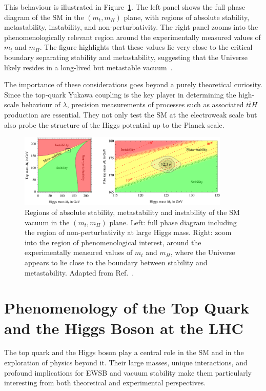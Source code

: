 This behaviour is illustrated in Figure~\ref{fig:vacuum_stability}. The left panel shows the full phase diagram of the SM in the $(m_t,m_H)$ plane, with regions of absolute stability, metastability, instability, and non-perturbativity. The right panel zooms into the phenomenologically relevant region around the experimentally measured values of $m_t$ and $m_H$. The figure highlights that these values lie very close to the critical boundary separating stability and metastability, suggesting that the Universe likely resides in a long-lived but metastable vacuum~\cite{Degrassi_2012}.

The importance of these considerations goes beyond a purely theoretical curiosity. Since the top-quark Yukawa coupling is the key player in determining the high-scale behaviour of $\lambda$, precision measurements of processes such as associated $t\bar{t}H$ production are essential. They not only test the SM at the electroweak scale but also probe the structure of the Higgs potential up to the Planck scale.

\begin{figure}[htbp]
    \centering
    \includegraphics[width=0.9\textwidth]{images/vacuum.png}
    \caption{
        Regions of absolute stability, metastability and instability of the SM vacuum in the $(m_t, m_H)$ plane. 
        Left: full phase diagram including the region of non-perturbativity at large Higgs mass. 
        Right: zoom into the region of phenomenological interest, around the experimentally measured values of $m_t$ and $m_H$, where the Universe appears to lie close to the boundary between stability and metastability. 
        Adapted from Ref.~\cite{Degrassi_2012}.
    }
    \label{fig:vacuum_stability}
\end{figure}
\section{Phenomenology of the Top Quark and the Higgs Boson at the LHC}
\label{sec:top_higgs_lhc}
The top quark and the Higgs boson play a central role in the SM and in the exploration of physics beyond it. Their large masses, unique interactions, and profound implications for EWSB and vacuum stability make them particularly interesting from both theoretical and experimental perspectives. 

